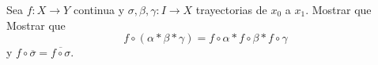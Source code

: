 \begin{ejercicio}
    Sea $f:X\to Y$ continua y $\sigma,\beta,\gamma:I\to X$ trayectorias de $x_0$ a $x_1$. Mostrar que
    Mostrar que 
    \begin{equation*}
        f\circ(\alpha*\beta*\gamma)=f\circ\alpha*f\circ\beta*f\circ\gamma
    \end{equation*}
    y $f\circ\overline{\sigma}=\overline{f\circ\sigma}$.
\end{ejercicio}

\begin{demostracion}

\end{demostracion}
